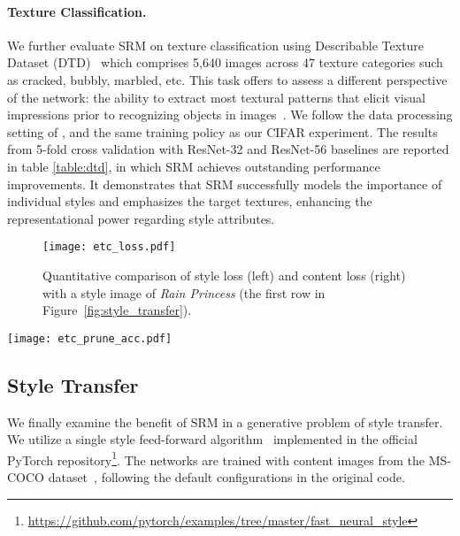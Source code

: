 \paragraph{Texture Classification.}
We further evaluate SRM on texture classification using Describable Texture Dataset (DTD)~\cite{cimpoi14describing} which comprises 5,640 images across 47 texture categories such as cracked, bubbly, marbled, etc.
This task offers to assess a different perspective of the network: the ability to extract most textural patterns that elicit visual impressions prior to recognizing objects in images~\cite{cimpoi2016deep}.
We follow the data processing setting of \cite{rebuffi2017learning}, and the same training policy as our CIFAR experiment. 
The results from 5-fold cross validation with ResNet-32 and ResNet-56 baselines are reported in table \ref{table:dtd}, in which SRM achieves outstanding performance improvements. 
It demonstrates that SRM successfully models the importance of individual styles and emphasizes the target textures, enhancing the representational power regarding style attributes.


\begin{figure}
\begin{center}
    \texttt{[image: etc\_loss.pdf]}
    \vspace{-1em}
    \caption{Quantitative comparison of style loss (left) and content loss (right) with a style image of \textit{Rain Princess} (the first row in Figure~\ref{fig:style_transfer}).}
\label{fig:loss}
\end{center}
\end{figure}

\begin{figure*}
\begin{center}
    \texttt{[image: etc\_prune\_acc.pdf]}
\caption{Top-1 validation accuracy of ResNet-50 on ImageNet after pruning channels of each stage according to estimated channel weights.
Stage 1 is omitted because it consists of a single convolutional layer where a recalibration module is not applied.
    } 
    \label{fig:prune_acc}
\end{center}
\end{figure*}


\subsection{Style Transfer}
We finally examine the benefit of SRM in a generative problem of style transfer.
We utilize a single style feed-forward algorithm~\cite{johnson2016perceptual} implemented in the official PyTorch repository\footnote{\url{https://github.com/pytorch/examples/tree/master/fast\_neural\_style}}.
The networks are trained with content images from the MS-COCO dataset~\cite{lin2014microsoft}, following the default configurations in the original code.


